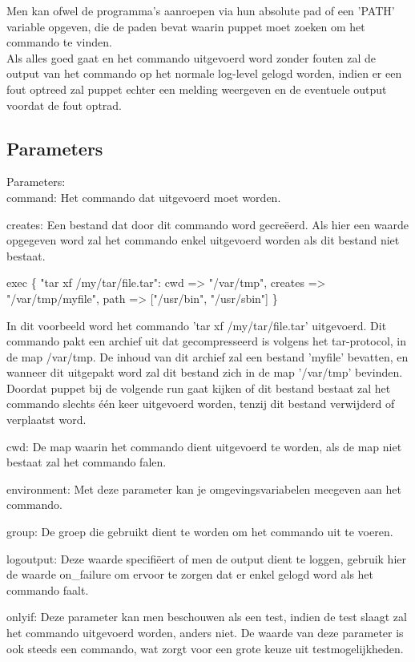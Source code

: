 	Men kan ofwel de programma's aanroepen via hun absolute pad of een 'PATH' variable opgeven, die de paden bevat waarin puppet moet zoeken om het commando te vinden.\\
	Als alles goed gaat en het commando uitgevoerd word zonder fouten zal de output van het commando op het normale log-level gelogd worden, indien er een fout optreed zal puppet echter een melding weergeven en de eventuele output voordat de fout optrad.\\


\subsection{Parameters}
Parameters:\\
		command:
		Het commando dat uitgevoerd moet worden.

		creates:
		Een bestand dat door dit commando word gecre\"{e}erd.
		Als hier een waarde opgegeven word zal het commando enkel uitgevoerd worden als dit bestand niet bestaat.

			exec \{ "tar xf /my/tar/file.tar":
				cwd => "/var/tmp",
				creates => "/var/tmp/myfile",
				path => ["/usr/bin", "/usr/sbin"]
			\}

		In dit voorbeeld word het commando 'tar xf /my/tar/file.tar' uitgevoerd.
		Dit commando pakt een archief uit dat gecompresseerd is volgens het tar-protocol, in de map /var/tmp.
		De inhoud van dit archief zal een bestand 'myfile' bevatten, en wanneer dit uitgepakt word zal dit bestand zich in de map '/var/tmp' bevinden.
		Doordat puppet bij de volgende run gaat kijken of dit bestand bestaat zal het commando slechts één keer uitgevoerd worden, tenzij dit bestand verwijderd of verplaatst word.

		cwd:
		De map waarin het commando dient uitgevoerd te worden, als de map niet bestaat zal het commando falen.

		environment:
		Met deze parameter kan je omgevingsvariabelen meegeven aan het commando.

		group:
		De groep die gebruikt dient te worden om het commando uit te voeren.

		logoutput:
		Deze waarde specifi\"{e}ert of men de output dient te loggen, gebruik hier de waarde on\_failure om ervoor te zorgen dat er enkel gelogd word als het commando faalt.

		onlyif:
		Deze parameter kan men beschouwen als een test, indien de test slaagt zal het commando uitgevoerd worden, anders niet.
		De waarde van deze parameter is ook steeds een commando, wat zorgt voor een grote keuze uit testmogelijkheden.

